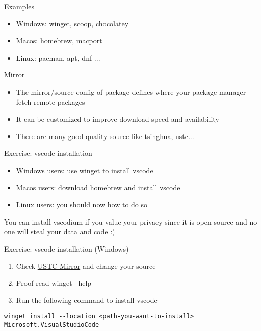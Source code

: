 \begin{frame}[fragile]{Examples}
	\begin{itemize}
		\item Windows: winget, scoop, chocolatey
		\item Macos: homebrew, macport
		\item Linux: pacman, apt, dnf ...
	\end{itemize}
\end{frame}

\begin{frame}[fragile]{Mirror}
	\begin{itemize}
		\item The mirror/source config of package defines where your package manager fetch remote packages
		\item It can be customized to improve download speed and availability
		\item There are many good quality source like tsinghua, ustc...
	\end{itemize}
\end{frame}

\begin{frame}[fragile]{Exercise: vscode installation}
	\begin{itemize}
		\item Windows users: use winget to install vscode
		\item Macos users: download homebrew and install vscode
		\item Linux users: you should now how to do so
	\end{itemize}

	You can install vscodium if you value your privacy since it is open source and no one will steal your data and code :)
\end{frame}

\begin{frame}[fragile]{Exercise: vscode installation (Windows)}
	\begin{enumerate}
		\item Check \href{https://mirrors.ustc.edu.cn/help/winget-source.html}{USTC Mirror} and change your source
		\item Proof read winget --help
		\item Run the following command to install vscode
	\end{enumerate}
	\begin{verbatim}
winget install --location <path-you-want-to-install> Microsoft.VisualStudioCode
	\end{verbatim}
		
\end{frame}

